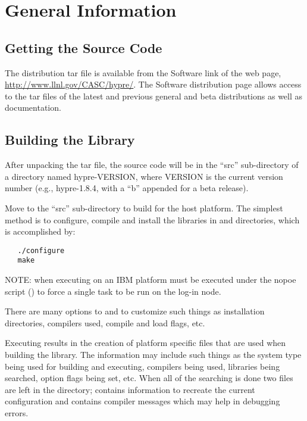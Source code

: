
\chapter{General Information}


\section{Getting the Source Code}

The \hypre{} distribution tar file is available from the Software link of the
\hypre{} web page, \url{http://www.llnl.gov/CASC/hypre/}.  The \hypre{} Software
distribution page allows access to the tar files of the latest and previous
general and beta distributions as well as documentation.


\section{Building the Library}

After unpacking the \hypre{} tar file, the source code will be in the ``src''
sub-directory of a directory named hypre-VERSION, where VERSION is the current
version number (e.g., hypre-1.8.4, with a ``b'' appended for a beta release).

Move to the ``src'' sub-directory to build \hypre{} for the host platform.  The
simplest method is to configure, compile and install the libraries in
 and  directories, which is accomplished
by:
\begin{verbatim}
   ./configure
   make
\end{verbatim}

NOTE: when executing on an IBM platform  must be executed under
the nopoe script () to force a
single task to be run on the log-in node.

There are many options to  and  to customize such
things as installation directories, compilers used, compile and load flags, etc.

Executing  results in the creation of platform specific files
that are used when building the library. The information may include such things
as the system type being used for building and executing, compilers being used,
libraries being searched, option flags being set, etc.  When all of the
searching is done two files are left in the  directory;
 contains information to recreate the current configuration
and  contains compiler messages which may help in debugging
 errors.


